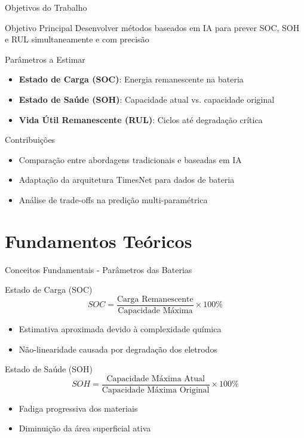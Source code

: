 \documentclass[aspectratio=169,xcolor=dvipsnames]{beamer}
\begin{document}
\begin{frame}{Objetivos do Trabalho}
  \begin{block}{Objetivo Principal}
    Desenvolver métodos baseados em IA para prever SOC, SOH e RUL simultaneamente e com precisão
  \end{block}
  
  \vspace{0.3cm}
  
  \begin{block}{Parâmetros a Estimar}
    \begin{itemize}
      \item \textbf{Estado de Carga (SOC)}: Energia remanescente na bateria
      \item \textbf{Estado de Saúde (SOH)}: Capacidade atual vs. capacidade original
      \item \textbf{Vida Útil Remanescente (RUL)}: Ciclos até degradação crítica
    \end{itemize}
  \end{block}
  
  \begin{exampleblock}{Contribuições}
    \begin{itemize}
      \item Comparação entre abordagens tradicionais e baseadas em IA
      \item Adaptação da arquitetura TimesNet para dados de bateria
      \item Análise de trade-offs na predição multi-paramétrica
    \end{itemize}
  \end{exampleblock}
\end{frame}

\section{Fundamentos Teóricos}
\begin{frame}{Conceitos Fundamentais - Parâmetros das Baterias}
  \begin{block}{Estado de Carga (SOC)}
    $$SOC = \frac{\text{Carga Remanescente}}{\text{Capacidade Máxima}} \times 100\%$$
    \begin{itemize}
      \item Estimativa aproximada devido à complexidade química
      \item Não-linearidade causada por degradação dos eletrodos
    \end{itemize}
  \end{block}
  
  \begin{block}{Estado de Saúde (SOH)}
    $$SOH = \frac{\text{Capacidade Máxima Atual}}{\text{Capacidade Máxima Original}} \times 100\%$$
    \begin{itemize}
      \item Fadiga progressiva dos materiais
      \item Diminuição da área superficial ativa
    \end{itemize}
  \end{block}
\end{frame}
\end{document}
